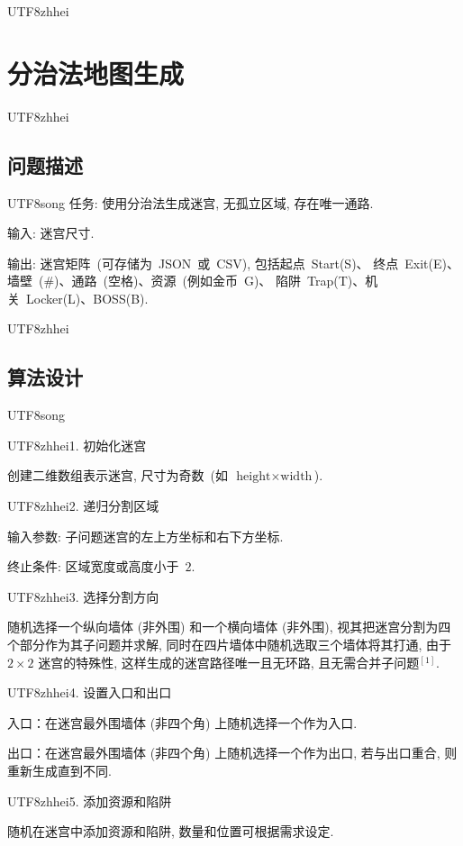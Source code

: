 \documentclass[10.5pt,compsoc]{CjC}
\theoremstyle{mystyle}
\begin{document}
\begin{CJK*}{UTF8}{zhhei}
\vskip 1mm
\section{分治法地图生成}
\end{CJK*}


\begin{CJK*}{UTF8}{zhhei}\subsection{问题描述}\end{CJK*}

\begin{CJK*}{UTF8}{song}
任务: 使用分治法生成迷宫, 无孤立区域, 存在唯一通路.

输入: 迷宫尺寸.

输出: 迷宫矩阵~(可存储为~JSON~或~CSV), 包括起点~Start(S)、
终点~Exit(E)、墙壁~(\#)、通路~(空格)、资源~(例如金币~G)、
陷阱~Trap(T)、机关~Locker(L)、BOSS(B).
\end{CJK*}

\begin{CJK*}{UTF8}{zhhei}\subsection{算法设计}\end{CJK*}

\begin{CJK*}{UTF8}{song}
\begin{CJK*}{UTF8}{zhhei}{1. 初始化迷宫}\end{CJK*}

创建二维数组表示迷宫, 尺寸为奇数~(如~$\textrm{height} \times \textrm{width}$).

\begin{CJK*}{UTF8}{zhhei}{2. 递归分割区域}\end{CJK*}

输入参数: 子问题迷宫的左上方坐标和右下方坐标.

终止条件: 区域宽度或高度小于~$2$.

\begin{CJK*}{UTF8}{zhhei}{3. 选择分割方向}\end{CJK*}

随机选择一个纵向墙体 (非外围) 和一个横向墙体 (非外围), 视其把迷宫分割为四个部分作为其子问题并求解,
同时在四片墙体中随机选取三个墙体将其打通, 由于~$2 \times 2$ 迷宫的特殊性,
这样生成的迷宫路径唯一且无环路, 且无需合并子问题$^{[1]}$.

\begin{CJK*}{UTF8}{zhhei}{4. 设置入口和出口}\end{CJK*}

入口：在迷宫最外围墙体 (非四个角) 上随机选择一个作为入口.

出口：在迷宫最外围墙体 (非四个角) 上随机选择一个作为出口, 若与出口重合, 则重新生成直到不同.

\begin{CJK*}{UTF8}{zhhei}{5. 添加资源和陷阱}\end{CJK*}

随机在迷宫中添加资源和陷阱, 数量和位置可根据需求设定.
\end{CJK*}
\end{document}
